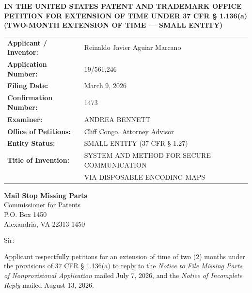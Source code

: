 \documentclass[11pt,letterpaper]{article}
\begin{document}
\thispagestyle{empty}

\begin{center}
    \textbf{\large IN THE UNITED STATES PATENT AND TRADEMARK OFFICE} \\
    \vspace{0.3cm}
    \textbf{\large PETITION FOR EXTENSION OF TIME UNDER 37 CFR \S{} 1.136(a)} \\
    \textbf{\normalsize (TWO-MONTH EXTENSION OF TIME --- SMALL ENTITY)}
\end{center}

\vspace{0.4cm}
\noindent\begin{tabular}{p{2.3in}p{4.0in}}
\textbf{Applicant / Inventor:} & Reinaldo Javier Aguiar Marcano \\
\textbf{Application Number:} & 19/561,246 \\
\textbf{Filing Date:} & March 9, 2026 \\
\textbf{Confirmation Number:} & 1473 \\
\textbf{Examiner:} & ANDREA BENNETT \\
\textbf{Office of Petitions:} & Cliff Congo, Attorney Advisor \\
\textbf{Entity Status:} & SMALL ENTITY (37 CFR \S{} 1.27) \\
\textbf{Title of Invention:} & SYSTEM AND METHOD FOR SECURE COMMUNICATION \\
& VIA DISPOSABLE ENCODING MAPS \\
\end{tabular}

\vspace{0.5cm}
\noindent\textbf{Mail Stop Missing Parts} \\
Commissioner for Patents \\
P.O. Box 1450 \\
Alexandria, VA 22313-1450

\vspace{0.2cm}
Sir:

Applicant respectfully petitions for an extension of time of two (2) months under the provisions of 37 CFR \S{} 1.136(a) to reply to the \textit{Notice to File Missing Parts of Nonprovisional Application} mailed July 7, 2026, and the \textit{Notice of Incomplete Reply} mailed August 13, 2026.
\end{document}
